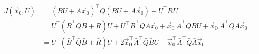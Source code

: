 \documentclass{article}
\begin{document}
\thispagestyle{empty}

\begin{align*}
J(\vec{x}_0, U) & = (\bar{B}U + \bar{A}\vec{x}_0)^\top\bar{Q}(\bar{B}U + \bar{A}\vec{x}_0)+U^\top\bar{R}U=\\
& = U^\top(\bar{B}^\top\bar{Q}\bar{B} + \bar{R})U + U^\top \bar{B}^\top \bar{Q} \bar{A}\vec{x}_0 + \vec{x}_0^\top \bar{A}^\top \bar{Q} \bar{B} U + \vec{x}_0^\top \bar{A}^\top \bar{Q} \bar{A} \vec{x}_0 = \\
& = U^\top(\bar{B}^\top\bar{Q}\bar{B} + \bar{R})U + 2 \vec{x}_0^\top \bar{A}^\top \bar{Q} \bar{B} U + \vec{x}_0^\top \bar{A}^\top \bar{Q} \bar{A} \vec{x}_0 
\end{align*}
\end{document}
